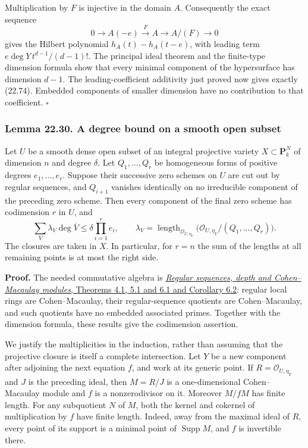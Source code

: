 \documentclass[
  11pt,
  a4paper,
]{article}
\begin{document}
Multiplication by \(F\) is injective in the domain \(A\). Consequently
the exact sequence \[
 0\longrightarrow A(-e)\xrightarrow{\ F\ }A
   \longrightarrow A/(F)\longrightarrow0
 \tag{22.75}
\] gives the Hilbert polynomial \(h_A(t)-h_A(t-e)\), with leading term
\(e\deg Y\,t^{d-1}/(d-1)!\). The principal ideal theorem and the
finite-type dimension formula show that every minimal component of the
hypersurface has dimension \(d-1\). The leading-coefficient additivity
just proved now gives exactly (22.74). Embedded components of smaller
dimension have no contribution to that coefficient. \(\square\)

\subsubsection{Lemma 22.30. A degree bound on a smooth open
subset}\label{lemma-22.30.-a-degree-bound-on-a-smooth-open-subset}

Let \(U\) be a smooth dense open subset of an integral projective
variety \(X\subset\mathbf P^N_k\) of dimension \(n\) and degree
\(\delta\). Let \(Q_1,\ldots,Q_r\) be homogeneous forms of positive
degrees \(e_1,\ldots,e_r\). Suppose their successive zero schemes on
\(U\) are cut out by regular sequences, and \(Q_{i+1}\) vanishes
identically on no irreducible component of the preceding zero scheme.
Then every component of the final zero scheme has codimension \(r\) in
\(U\), and \[
 \sum_V\lambda_V\deg\overline V
       \le\delta\prod_{i=1}^r e_i,
 \qquad
 \lambda_V=\operatorname{length}_{\mathcal O_{U,\eta_V}}
    \bigl(\mathcal O_{U,\eta_V}/(Q_1,\ldots,Q_r)\bigr).
 \tag{22.76}
\] The closures are taken in \(X\). In particular, for \(r=n\) the sum
of the lengths at all remaining points is at most the right side.

\textbf{Proof.} The needed commutative algebra is
\href{https://kokunoyumeto.github.io/open-math-courses-public/courses/AG-CA/AG-CA-12.html}{\emph{Regular sequences, depth and
Cohen--Macaulay modules}, Theorems 4.1, 5.1 and 6.1 and Corollary 6.2}:
regular local rings are Cohen--Macaulay, their regular-sequence
quotients are Cohen--Macaulay, and such quotients have no embedded
associated primes. Together with the dimension formula, these results
give the codimension assertion.

We justify the multiplicities in the induction, rather than assuming
that the projective closure is itself a complete intersection. Let \(Y\)
be a new component after adjoining the next equation \(f\), and work at
its generic point. If \(R=\mathcal O_{U,\eta_Y}\) and \(J\) is the
preceding ideal, then \(M=R/J\) is a one-dimensional Cohen--Macaulay
module and \(f\) is a nonzerodivisor on it. Moreover \(M/fM\) has finite
length. For any subquotient \(N\) of \(M\), both the kernel and cokernel
of multiplication by \(f\) have finite length. Indeed, away from the
maximal ideal of \(R\), every point of its support is a minimal point of
\(\operatorname{Supp}M\), and \(f\) is invertible there.
\end{document}
